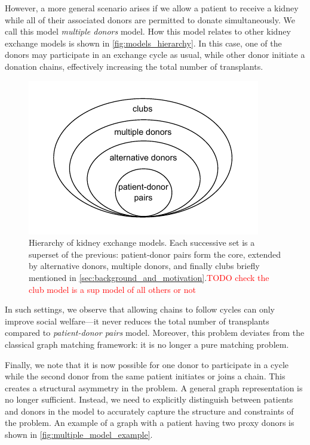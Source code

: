 However, a more general scenario arises if we allow a patient to receive a kidney while all of their associated donors are permitted to donate simultaneously. We call this model \textit{multiple donors} model. How this model relates to other kidney exchange models is shown in \autoref{fig:models_hierarchy}. In this case, one of the donors may participate in an exchange cycle as usual, while other donor initiate a donation chains, effectively increasing the total number of transplants.




\begin{figure}
    \centering
    \includegraphics{data/models_hierarchy.pdf}
    \caption[Hierarchy of kidney exchange models]{Hierarchy of kidney exchange models. Each successive set is a superset of the previous: patient-donor pairs form the core, extended by alternative donors, multiple donors, and finally clubs briefly mentioned in \autoref{sec:background_and_motivation}.\textcolor{red}{TODO check the club model is a sup model of all others or not}}
    \label{fig:models_hierarchy}
\end{figure}

In such settings, we observe that allowing chains to follow cycles can only improve social welfare—it never reduces the total number of transplants compared to \textit{patient-donor pairs} model. Moreover, this problem deviates from the classical graph matching framework: it is no longer a pure matching problem.

Finally, we note that it is now possible for one donor to participate in a cycle while the second donor from the same patient initiates or joins a chain. This creates a structural asymmetry in the problem. A general graph representation is no longer sufficient. Instead, we need to explicitly distinguish between patients and donors in the model to accurately capture the structure and constraints of the problem. An example of a graph with a patient having two proxy donors is shown in \autoref{fig:multiple_model_example}.

